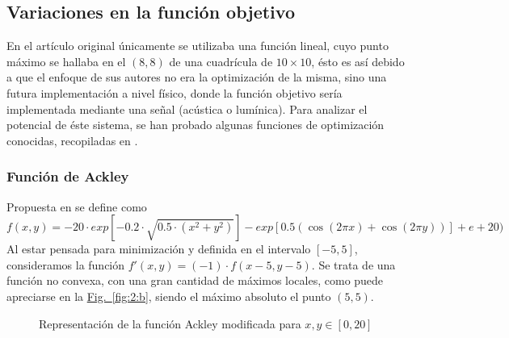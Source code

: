 \documentclass[runningheads]{llncs}
\newcommand{\refcruzada}[2]{\hyperref[#2]{#1~\ref{#2}}}
\begin{document}



    \subsection{Variaciones en la función objetivo}
    En el artículo original \cite{initialPaper} únicamente se utilizaba una función lineal, cuyo punto máximo se hallaba en el $(8,8)$ de una cuadrícula de $10\times10$, ésto es así debido a que el enfoque de sus autores no era la optimización de la misma, sino una futura implementación a nivel físico, donde la función objetivo sería implementada mediante una señal (acústica o lumínica). Para analizar el potencial de éste sistema, se han probado algunas funciones de optimización conocidas, recopiladas en \cite{WebFuncionesOptimizacion}.

    \subsubsection{Función de Ackley} Propuesta en \cite{AckleyFunction} se define como
    \[ f(x,y)=-20 \cdot exp[-0.2 \cdot \sqrt{0.5 \cdot (x^2 + y^2)}] - exp[0.5 ( \cos(2 \pi x)
    + \cos(2 \pi y))] + e + 20)\]
    Al estar pensada para minimización y definida en el intervalo $[-5,5]$, consideramos la función $f'(x,y)=(-1)\cdot f(x-5, y-5)$. Se trata de una función no convexa, con una gran cantidad de máximos locales, como puede apreciarse en la \refcruzada{Fig.}{fig:2:b}, siendo el máximo absoluto el punto $(5,5)$.

    \begin{figure}[htbp]
        \centering
        \caption{Representación de la función Ackley modificada para $x,y\in[0,20]$}
    \end{figure}
\end{document}
